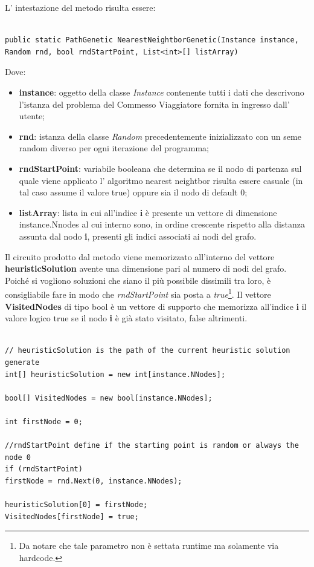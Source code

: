\documentclass[11pt]{article}
\begin{document}
L' intestazione del metodo risulta essere:

\begin{lstlisting}

public static PathGenetic NearestNeightborGenetic(Instance instance, Random rnd, bool rndStartPoint, List<int>[] listArray)

\end{lstlisting}


Dove:


\begin{itemize}
    \item \textbf{instance}: oggetto della classe \textit{Instance} contenente tutti i dati che descrivono l'istanza del problema del Commesso Viaggiatore fornita in ingresso dall' utente;
    \item \textbf{rnd}: istanza della classe \textit{Random} precedentemente inizializzato con un seme random diverso per ogni iterazione del programma;
    \item \textbf{rndStartPoint}: variabile booleana che determina se il nodo di partenza sul quale viene applicato l' algoritmo nearest neightbor risulta essere casuale (in tal caso assume il valore true) oppure sia il nodo di default 0;
    \item \textbf{listArray}: lista in cui all'indice \textbf{i} è presente un vettore di dimensione instance.Nnodes al cui interno sono, in ordine crescente rispetto alla distanza assunta dal nodo \textbf{i}, presenti gli indici associati ai nodi del grafo.
\end{itemize}

Il circuito prodotto dal metodo viene memorizzato all'interno del vettore \textbf{heuristicSolution} avente una dimensione pari al numero di nodi del grafo. Poiché si vogliono soluzioni che siano il più possibile dissimili tra loro, è consigliabile fare in modo che \textit{rndStartPoint} sia posta a \textit{true}\footnote{Da notare che tale parametro non è settata runtime ma solamente via hardcode.}. Il vettore \textbf{VisitedNodes} di tipo bool è un vettore di supporto che memorizza all'indice \textbf{i} il valore logico true se il nodo \textbf{i} è già stato visitato, false altrimenti.

\begin{lstlisting}

// heuristicSolution is the path of the current heuristic solution generate
int[] heuristicSolution = new int[instance.NNodes];

bool[] VisitedNodes = new bool[instance.NNodes];

int firstNode = 0;

//rndStartPoint define if the starting point is random or always the node 0 
if (rndStartPoint)
firstNode = rnd.Next(0, instance.NNodes);

heuristicSolution[0] = firstNode;
VisitedNodes[firstNode] = true;

\end{lstlisting}
\end{document}

